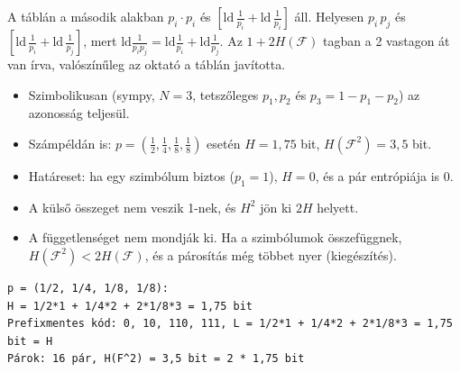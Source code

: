 \begin{center}\end{center}
\begin{figyelem}[Javítás]
A táblán a második alakban $p_i\cdot p_i$ és $[\mathrm{ld}\,\tfrac1{p_i}+\mathrm{ld}\,\tfrac1{p_i}]$ áll. Helyesen $p_i\,p_j$ és $[\mathrm{ld}\,\tfrac1{p_i}+\mathrm{ld}\,\tfrac1{p_j}]$, mert $\mathrm{ld}\tfrac{1}{p_ip_j}=\mathrm{ld}\tfrac1{p_i}+\mathrm{ld}\tfrac1{p_j}$. Az $1+2H(\mathcal F)$ tagban a 2 vastagon át van írva, valószínűleg az oktató a táblán javította.
\end{figyelem}
\begin{eredmeny}

\begin{center}\end{center}
\end{eredmeny}
\begin{tipp}[Ellenőrzés]
\begin{itemize}
\item Szimbolikusan (sympy, $N=3$, tetszőleges $p_1,p_2$ és $p_3=1-p_1-p_2$) az azonosság teljesül.
\item Számpéldán is: $p=(\tfrac12,\tfrac14,\tfrac18,\tfrac18)$ esetén $H=1{,}75$ bit, $H(\mathcal F^2)=3{,}5$ bit.
\item Határeset: ha egy szimbólum biztos ($p_1=1$), $H=0$, és a pár entrópiája is 0.
\end{itemize}
\end{tipp}
\begin{figyelem}
\begin{itemize}
\item A külső összeget nem veszik 1-nek, és $H^2$ jön ki $2H$ helyett.
\item A függetlenséget nem mondják ki. Ha a szimbólumok összefüggnek, $H(\mathcal F^2)<2H(\mathcal F)$, és a párosítás még többet nyer (kiegészítés).
\end{itemize}
\end{figyelem}
\begin{tipp}
\small
\begin{verbatim}
p = (1/2, 1/4, 1/8, 1/8):
H = 1/2*1 + 1/4*2 + 2*1/8*3 = 1,75 bit
Prefixmentes kód: 0, 10, 110, 111, L = 1/2*1 + 1/4*2 + 2*1/8*3 = 1,75 bit = H
Párok: 16 pár, H(F^2) = 3,5 bit = 2 * 1,75 bit
\end{verbatim}
\end{tipp}
